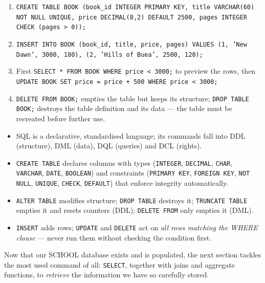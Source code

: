 \documentclass[11pt]{article}
\begin{document}
\begin{corrige}[Exercise 1]
\begin{enumerate}
\item \texttt{CREATE TABLE BOOK (book\_id INTEGER PRIMARY KEY, title VARCHAR(60) NOT NULL UNIQUE, price DECIMAL(8,2) DEFAULT 2500, pages INTEGER CHECK (pages > 0));}
\item \texttt{INSERT INTO BOOK (book\_id, title, price, pages) VALUES (1, 'New Dawn', 3000, 180), (2, 'Hills of Buea', 2500, 120);}
\item First \texttt{SELECT * FROM BOOK WHERE price < 3000;} to preview the rows, then \texttt{UPDATE BOOK SET price = price + 500 WHERE price < 3000;}
\item \texttt{DELETE FROM BOOK;} empties the table but keeps its structure; \texttt{DROP TABLE BOOK;} destroys the table definition and its data — the table must be recreated before further use.
\end{enumerate}
\end{corrige}

\begin{aretenir}
\begin{itemize}
\item SQL is a declarative, standardised language; its commands fall into DDL (structure), DML (data), DQL (queries) and DCL (rights).
\item \texttt{CREATE TABLE} declares columns with types (\texttt{INTEGER}, \texttt{DECIMAL}, \texttt{CHAR}, \texttt{VARCHAR}, \texttt{DATE}, \texttt{BOOLEAN}) and constraints (\texttt{PRIMARY KEY}, \texttt{FOREIGN KEY}, \texttt{NOT NULL}, \texttt{UNIQUE}, \texttt{CHECK}, \texttt{DEFAULT}) that enforce integrity automatically.
\item \texttt{ALTER TABLE} modifies structure; \texttt{DROP TABLE} destroys it; \texttt{TRUNCATE TABLE} empties it and resets counters (DDL); \texttt{DELETE FROM} only empties it (DML).
\item \texttt{INSERT} adds rows; \texttt{UPDATE} and \texttt{DELETE} act on \emph{all rows matching the WHERE clause} — never run them without checking the condition first.
\end{itemize}
\end{aretenir}

Now that our SCHOOL database exists and is populated, the next section tackles the most used command of all: \texttt{SELECT}, together with joins and aggregate functions, to \emph{retrieve} the information we have so carefully stored.
\end{document}
